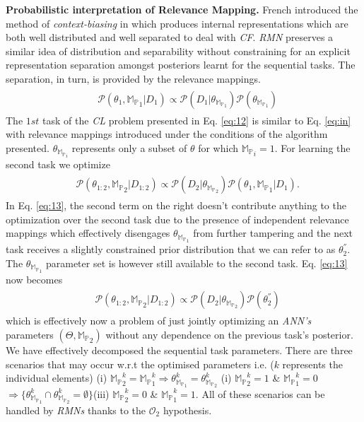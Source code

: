 \documentclass{article}
\begin{document}
\textbf{Probabilistic interpretation of Relevance Mapping.}
French introduced the method of \textit{context-biasing} in  which produces internal representations which are both well distributed and well separated to deal with \textit{CF}. \textit{RMN} preserves a similar idea of distribution and separability without constraining for an explicit representation separation amongst posteriors learnt for the sequential tasks. The separation, in turn, is provided by the relevance mappings. 
\begin{eqnarray}
    \begin{aligned}
    &\mathcal{P}(\theta_1,\mathbb{M_P}_1|D_1) \propto \mathcal{P}(D_1|\theta_{\mathbb{M_P}_1})\mathcal{P}(\theta_{\mathbb{M_P}_1}) \label{eq:12}
\end{aligned}
\end{eqnarray}
The $1st$ task of the \textit{CL} problem presented in Eq. \eqref{eq:12} is similar to Eq. \eqref{eq:in} with relevance mappings introduced under the conditions of the algorithm presented. $\theta_{\mathbb{M_P}_i}$ represents only a subset of $\theta$ for which $\mathbb{M_P}_i=1$. For learning the second task we optimize
\begin{eqnarray}
    \begin{aligned}
&\mathcal{P}(\theta_{1:2}, \mathbb{M_P}_2|D_{1:2}) \propto \mathcal{P}(D_2|\theta_{\mathbb{M_P}_2})\mathcal{P}(\theta_1, \mathbb{M_P}_1|D_1). \label{eq:13}
    \end{aligned}
\end{eqnarray}
In Eq. \eqref{eq:13}, the second term on the right doesn't contribute anything to the optimization over the second task due to the presence of independent relevance mappings which effectively disengages $\theta_{\mathbb{M_P}_1}$ from further tampering and the next task receives a slightly constrained prior distribution that we can refer to as $\theta_2^{''}$. The $\theta_{\mathbb{M_P}_1}$ parameter set is however still available to the second task. Eq. \eqref{eq:13} now becomes 
\begin{eqnarray}
    \begin{aligned}
    &\mathcal{P}(\theta_{1:2}, \mathbb{M_P}_2|D_{1:2}) \propto \mathcal{P}(D_2|\theta_{\mathbb{M_P}_2})\mathcal{P}(\theta_2^{''}) \label{eq:14}
    \end{aligned}
\end{eqnarray}
which is effectively now a problem of just jointly optimizing an \textit{ANN's} parameters $(\Theta, \mathbb{M_P}_2)$ without any dependence on the previous task's posterior. We have effectively decomposed the sequential task parameters.
There are three scenarios that may occur w.r.t the optimised parameters i.e. ($k$ represents the individual elements) (i) $\mathbb{M_P}_2^k = \mathbb{M_P}_1^k \Rightarrow \theta_{\mathbb{M_P}_1}^k=\theta_{\mathbb{M_P}_2}^k$  (i) $\mathbb{M_P}_2^k = 1$ \& $\mathbb{M_P}_1^k=0$ $\Rightarrow \{\theta_{\mathbb{M_P}_1}^k\cap\theta_{\mathbb{M_P}_2}^k=\emptyset\}$(iii) $\mathbb{M_P}_2^k = 0$ \& $\mathbb{M_P}_1^k=1$. All of these scenarios can be handled by \textit{RMNs} thanks to the $\mathcal{O}_2$ hypothesis.
\end{document}
